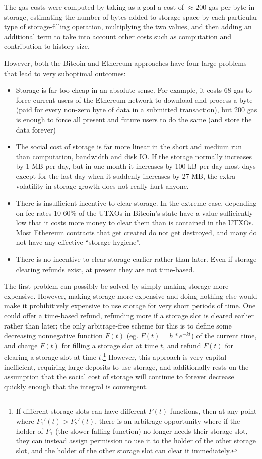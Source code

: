 \documentclass[12pt, final]{article}
\begin{document}
The gas costs were computed by taking as a goal a cost of $\approx 200$ gas per byte in storage, estimating the number of bytes added to storage space by each particular type of storage-filling operation, multiplying the two values, and then adding an additional term to take into account other costs such as computation and contribution to history size.

However, both the Bitcoin and Ethereum approaches have four large problems that lead to very suboptimal outcomes:

\begin{itemize}
\item Storage is far too cheap in an absolute sense. For example, it costs 68 gas to force current users of the Ethereum network to download and process a byte (paid for every non-zero byte of data in a submitted transaction), but 200 gas is enough to force all present and future users to do the same (and store the data forever)
\item The social cost of storage is far more linear in the short and medium run than computation, bandwidth and disk IO. If the storage normally increases by 1 MB per day, but in one month it increases by 100 kB per day most days except for the last day when it suddenly increases by 27 MB, the extra volatility in storage growth does not really hurt anyone.
\item There is insufficient incentive to clear storage. In the extreme case, depending on fee rates 10-60\% of the UTXOs in Bitcoin's state\cite{utxo5} have a value sufficiently low that it costs more money to clear them than is contained in the UTXOs. Most Ethereum contracts that get created do not get destroyed, and many do not have any effective ``storage hygiene''.
\item There is no incentive to clear storage earlier rather than later. Even if storage clearing refunds exist, at present they are not time-based.
\end{itemize}

The first problem can possibly be solved by simply making storage more expensive. However, making storage more expensive and doing nothing else would make it prohibitively expensive to use storage for very short periods of time. One could offer a time-based refund, refunding more if a storage slot is cleared earlier rather than later; the only arbitrage-free scheme for this is to define some decreasing nonnegative function $F(t)$ (eg. $F(t) = h * e^{-kt}$) of the current time, and charge $F(t)$ for filling a storage slot at time $t$, and refund $F(t)$ for clearing a storage slot at time $t$.\footnote{If different storage slots can have different $F(t)$ functions, then at any point where $F_1'(t) > F_2'(t)$, there is an arbitrage opportunity where if the holder of $F_1$ (the slower-falling function) no longer needs their storage slot, they can instead assign permission to use it to the holder of the other storage slot, and the holder of the other storage slot can clear it immediately.} However, this approach is very capital-inefficient, requiring large deposits to use storage, and additionally rests on the assumption that the social cost of storage will continue to forever decrease quickly enough that the integral is convergent.
\end{document}
